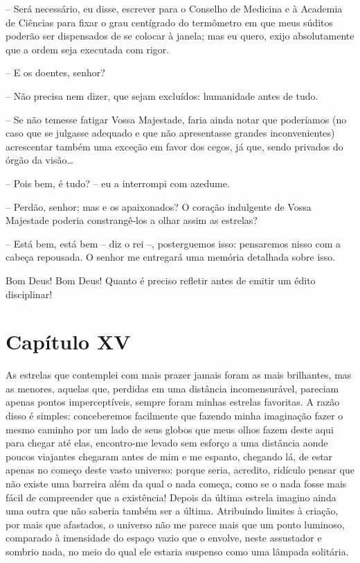 -- Será necessário, eu disse, escrever para o Conselho de Medicina e à
Academia de Ciências para fixar o grau centígrado do termômetro em que
meus súditos poderão ser dispensados de se colocar à janela; mas eu
quero, exijo absolutamente que a ordem seja executada com rigor. 

-- E os doentes, senhor?

-- Não precisa nem dizer, que sejam excluídos: humanidade antes de
tudo. 

-- Se não temesse fatigar Vossa Majestade, faria ainda notar que
poderíamos (no caso que se julgasse adequado e que não apresentasse
grandes inconvenientes) acrescentar também uma exceção em favor dos
cegos, já que, sendo privados do órgão da visão\ldots

-- Pois bem, é tudo? -- eu a interrompi com azedume.

-- Perdão, senhor; mas e os apaixonados? O coração indulgente de Vossa
Majestade poderia constrangê-los a olhar assim as estrelas? 

-- Está bem, está bem -- diz o rei --, posterguemos isso: pensaremos nisso
com a cabeça repousada. O senhor me entregará uma memória detalhada sobre
isso.

Bom Deus! Bom Deus! Quanto é preciso refletir antes de emitir um édito
disciplinar!

\section{Capítulo XV}

 As estrelas que contemplei com mais prazer jamais foram as mais
brilhantes, mas as menores, aquelas que, perdidas em uma distância
incomensurável, pareciam apenas pontos imperceptíveis, sempre foram
minhas estrelas favoritas. A razão disso é simples: conceberemos
facilmente que fazendo minha imaginação fazer o mesmo caminho por um
lado de seus globos que meus olhos fazem deste aqui para chegar até
elas, encontro-me levado sem esforço a uma distância aonde poucos
viajantes chegaram antes de mim e me espanto, chegando lá, de estar
apenas no começo deste vasto universo: porque seria, acredito, ridículo
pensar que não existe uma barreira além da qual o nada começa, como se
o nada fosse mais fácil de compreender que a existência! Depois da
última estrela imagino ainda uma outra que não saberia também ser a
última. Atribuindo limites à criação, por mais que afastados, o
universo não me parece mais que um ponto luminoso, comparado à
imensidade do espaço vazio que o envolve, neste assustador e sombrio
nada, no meio do qual ele estaria suspenso como uma lâmpada solitária.

